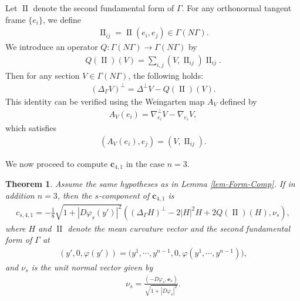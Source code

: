 \documentclass[11pt,reqno]{amsart}
\newtheorem{theorem}{Theorem}[section]
\theoremstyle{definition}
\numberwithin{equation}{section}
\begin{document}
Let $\operatorname{II}$ denote the second fundamental form of $\Gamma$. For any orthonormal tangent frame $\{e_i\}$, we define
\begin{align}
\operatorname{II}_{ij} = \operatorname{II}(e_i, e_j)
\in \Gamma(N\Gamma).
\end{align}
We introduce an operator $Q: \Gamma(N\Gamma)\to \Gamma(N\Gamma)$ by
\begin{align}
Q(\operatorname{II})(V) = \sum_{i,j} ( V, \operatorname{II}_{ij}) \operatorname{II}_{ij}.
\end{align}
Then for any section $V\in \Gamma(N\Gamma)$, the following holds:
\begin{align}\label{eq-Q-II}
(\Delta_\Gamma V)^\perp = \Delta^\perp V - Q(\operatorname{II})(V).
\end{align}
This identity can be verified using the Weingarten map $A_V$ defined by
\begin{align}
A_V(e_i) = \nabla_{e_i}^\perp V - \nabla_{e_i} V,
\end{align}
which satisfies
\begin{align}
( A_V(e_i), e_j) = ( V, \operatorname{II}_{ij}).
\end{align}

We now proceed to compute $\mathbf{c}_{4,1}$ in the case $n=3$.
\begin{theorem}\label{thm-c41}
Assume the same hypotheses as in Lemma \ref{lem-Form-Comp}. If in addition $n=3$, then the $s$-component of $\mathbf{c}_{4,1}$ is
\begin{align}\label{eq-c-41}
c_{s, 4,1} = -\frac{1}{8}\sqrt{1+|D\varphi_s(y')|^2} \left( (\Delta_\Gamma H)^\perp-2|H|^2 H + 2Q(\operatorname{II})(H), \nu_s \right),
\end{align}
where $H$ and $\operatorname{II}$ denote the mean curvature vector and the second fundamental form of $\Gamma$ at
\begin{align}
(y', 0, \varphi(y')) = \bigl(y^1,\cdots, y^{n-1}, 0, \varphi(y^1,\cdots, y^{n-1})\bigr),
\end{align}
and $\nu_s$ is the unit normal vector given by
\begin{align}
\nu_s = \frac{(-D\varphi_s, \mathbf{e}_s)}{\sqrt{1+|D \varphi_s|^2}}.
\end{align}
\end{theorem}
\end{document}
